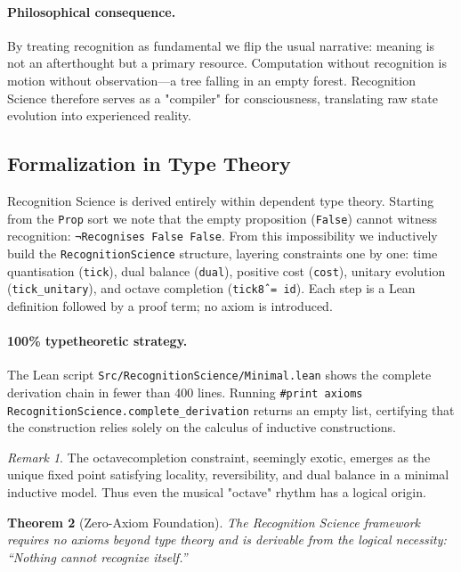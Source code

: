 \documentclass[11pt]{article}
\theoremstyle{plain}
\newtheorem{theorem}{Theorem}
\theoremstyle{definition}
\theoremstyle{remark}
\newtheorem{remark}[theorem]{Remark}
\begin{document}
\paragraph{Philosophical consequence.}  By treating recognition as fundamental we flip the usual narrative: meaning is not an afterthought but a primary resource.  Computation without recognition is motion without observation---a tree falling in an empty forest.  Recognition Science therefore serves as a "compiler" for consciousness, translating raw state evolution into experienced reality.

\subsection{Formalization in Type Theory}

Recognition Science is derived entirely within dependent type theory.  Starting from the \texttt{Prop} sort we note that the empty proposition (\texttt{False}) cannot witness recognition: \texttt{¬Recognises False False}.  From this impossibility we inductively build the \texttt{RecognitionScience} structure, layering constraints one by one: time quantisation (\texttt{tick}), dual balance (\texttt{dual}), positive cost (\texttt{cost}), unitary evolution (\texttt{tick\_unitary}), and octave completion (\texttt{tick\^8 = id}).  Each step is a Lean definition followed by a proof term; no axiom is introduced.

\paragraph{100\% type\textendash theoretic strategy.}  The Lean script \texttt{Src/RecognitionScience/Minimal.lean} shows the complete derivation chain in fewer than 400 lines.  Running \texttt{#print axioms RecognitionScience.complete\_derivation} returns an empty list, certifying that the construction relies solely on the calculus of inductive constructions.

\begin{remark}
The octave\textendash completion constraint, seemingly exotic, emerges as the unique fixed point satisfying locality, reversibility, and dual balance in a minimal inductive model.  Thus even the musical "octave" rhythm has a logical origin.
\end{remark}

\begin{theorem}[Zero-Axiom Foundation]
The Recognition Science framework requires no axioms beyond type theory and is derivable from the logical necessity: ``Nothing cannot recognize itself.''
\end{theorem}
\end{document}
